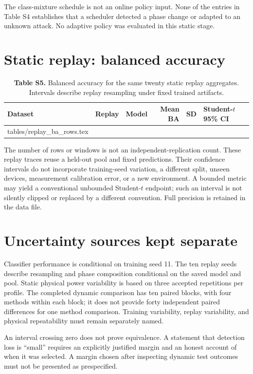 \documentclass[10pt,a4paper]{article}
\makeatletter
\newcommand{\tableinput}[1]{\@@input #1.tex }
\makeatother
\begin{document}
The class-mixture schedule is not an online policy input. None of the entries in Table S4 establishes that a scheduler detected a phase change or adapted to an unknown attack. No adaptive policy was evaluated in this static stage.

\clearpage
\section{Static replay: balanced accuracy}
\begin{table}[h!]
\centering\small
\caption*{\textbf{Table S5.} Balanced accuracy for the same twenty static replay aggregates. Intervals describe replay resampling under fixed trained artifacts.}
\begin{tabular}{lllrrl}\toprule
Dataset & Replay & Model & Mean BA & SD & Student-$t$ 95\% CI\\\midrule
\tableinput{tables/replay_ba_rows}
\bottomrule\end{tabular}
\end{table}
The number of rows or windows is not an independent-replication count. These replay traces reuse a held-out pool and fixed predictions. Their confidence intervals do not incorporate training-seed variation, a different split, unseen devices, measurement calibration error, or a new environment. A bounded metric may yield a conventional unbounded Student-$t$ endpoint; such an interval is not silently clipped or replaced by a different convention. Full precision is retained in the data file.

\section{Uncertainty sources kept separate}
Classifier performance is conditional on training seed 11. The ten replay seeds describe resampling and phase composition conditional on the saved model and pool. Static physical power variability is based on three accepted repetitions per profile. The completed dynamic comparison has ten paired blocks, with four methods within each block; it does not provide forty independent paired differences for one method comparison. Training variability, replay variability, and physical repeatability must remain separately named.

An interval crossing zero does not prove equivalence. A statement that detection loss is ``small'' requires an explicitly justified margin and an honest account of when it was selected. A margin chosen after inspecting dynamic test outcomes must not be presented as prespecified.
\end{document}
